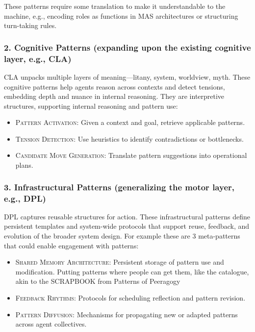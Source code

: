 \documentclass[acmlarge,timestamp]{acmart}
\providecommand{\tightlist}{%
  \setlength{\itemsep}{0pt}\setlength{\parskip}{0pt}}
\begin{document}
{These patterns require some translation to make it understandable to
the machine, e.g., encoding roles as functions in MAS architectures or
structuring turn-taking rules.

\subsubsection*{2. Cognitive Patterns (expanding upon the existing cognitive layer,
e.g., CLA)}

CLA unpacks multiple layers of meaning---litany, system, worldview,
myth. These cognitive patterns help agents reason across contexts and
detect tensions, embedding depth and nuance in internal
reasoning. They are interpretive structures, supporting internal
reasoning and pattern use:

\begin{itemize}
\tightlist
\item[]
  {\scshape{Pattern Activation}}{: Given a context and goal, retrieve applicable
  patterns.}
\item[]
  {\scshape{Tension Detection}}{: Use heuristics to identify contradictions or
  bottlenecks.}
\item[]
  {\scshape{Candidate Move Generation}}{: Translate pattern suggestions into
  operational plans.}
\end{itemize}

\subsubsection*{3. Infrastructural Patterns (generalizing the motor layer, e.g., DPL)}

DPL captures reusable structures for action. These infrastructural
patterns define persistent templates and system-wide protocols that
support reuse, feedback, and evolution of the broader system
design. For example these are 3 meta-patterns that could enable
engagement with patterns:

\begin{itemize}
\tightlist
\item[]
  {\scshape{Shared Memory Architecture}}{: Persistent storage of pattern use and
  modification. Putting patterns where people can get them, like the
  catalogue, akin to the SCRAPBOOK from Patterns of Peeragogy \cite{10.5555/3124497.3124531}}
\item[]
  {\scshape{Feedback Rhythms}}{: Protocols for scheduling reflection
    and pattern revision.}
\item[]
  {\scshape {Pattern Diffusion}}{: Mechanisms for propagating new or
    adapted patterns across agent collectives.}
\end{itemize}

}
\end{document}

